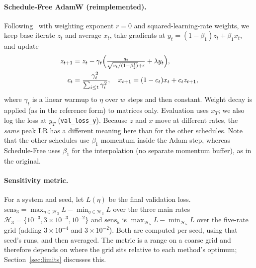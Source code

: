 \paragraph{Schedule-Free AdamW (reimplemented).} Following~\cite{defazio2024road} with weighting exponent $r=0$ and squared-learning-rate weights, we keep base iterate $z_t$ and average $x_t$, take gradients at $y_t=(1-\beta_1)z_t+\beta_1 x_t$, and update
\begin{align}
z_{t+1} &= z_t - \gamma_t\Bigl(\tfrac{g_t}{\sqrt{v_t/(1-\beta_2^t)}+\epsilon} + \lambda y_t\Bigr),\\
c_t &= \frac{\gamma_t^2}{\sum_{i\le t}\gamma_i^2},\quad x_{t+1}=(1-c_t)x_t + c_t z_{t+1},
\end{align}
where $\gamma_t$ is a linear warmup to $\eta$ over $w$ steps and then constant. Weight decay is applied (as in the reference form) to matrices only. Evaluation uses $x_T$; we also log the loss at $y_T$ (\texttt{val\_loss\_y}). Because $z$ and $x$ move at different rates, the \emph{same} peak LR has a different meaning here than for the other schedules. Note that the other schedules use $\beta_1$ momentum inside the Adam step, whereas Schedule-Free uses $\beta_1$ for the interpolation (no separate momentum buffer), as in the original.

\paragraph{Sensitivity metric.} For a system and seed, let $L(\eta)$ be the final validation loss. $\text{sens}_3=\max_{\eta\in\mathcal H_3}L-\min_{\eta\in\mathcal H_3}L$ over the three main rates $\mathcal H_3=\{10^{-3},3\times10^{-3},10^{-2}\}$ and $\text{sens}_5$ is $\max_{\mathcal H_5}L-\min_{\mathcal H_5}L$ over the five-rate grid (adding $3\times10^{-4}$ and $3\times10^{-2}$). Both are computed per seed, using that seed's runs, and then averaged. The metric is a range on a coarse grid and therefore depends on where the grid sits relative to each method's optimum; Section~\ref{sec:limits} discusses this.

